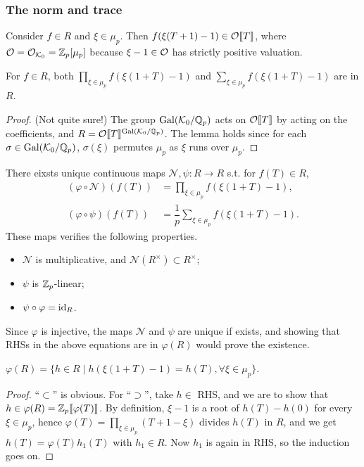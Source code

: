 \subsubsection{The norm and trace}

Consider $f\in R$ and $\xi\in\mu_p$.
Then $f(\xi(T + 1) - 1)\in \mathcal{O}\llbracket T \rrbracket$,
where $\mathcal{O} = \mathcal{O}_{\mathcal{K}_0} = \mathbb{Z}_p[\mu_p]$ because $\xi - 1\in\mathcal{O}$ has strictly positive valuation.

\begin{lemma}
    For $f\in R$, both
    $\prod_{\xi\in\mu_p} f(\xi(1 + T) - 1)$ and
    $\sum_{\xi\in\mu_p} f(\xi(1 + T) - 1)$ are in $R$.
\end{lemma}
\begin{proof}
    (Not quite sure!)
    The group $\operatorname{Gal}(\mathcal{K}_0/\mathbb{Q}_p)$ acts on $\mathcal{O}\llbracket T \rrbracket$ by acting on the coefficients,
    and $R = \mathcal{O}\llbracket T \rrbracket^{\operatorname{Gal}(\mathcal{K}_0/\mathbb{Q}_p)}$.
    The lemma holds since for each $\sigma\in\operatorname{Gal}(\mathcal{K}_0/\mathbb{Q}_p)$,
    $\sigma(\xi)$ permutes $\mu_p$ as $\xi$ runs over $\mu_p$.
\end{proof}


\begin{proposition}\label{definition of psi/trace and N/norm on Zp[[T]]}
    There eixsts unique continuous maps $\mathcal{N}, \psi : R\to R$ s.t. for $f(T)\in R$,
    \begin{align*}
        (\varphi\circ\mathcal{N})(f(T)) &= \prod_{\xi\in\mu_p} f(\xi(1 + T) - 1),\\
        (\varphi\circ\psi)(f(T)) &= \dfrac{1}{p}
        \sum_{\xi\in\mu_p} f(\xi(1 + T) - 1).
    \end{align*}
    These maps verifies the following properties.
    \begin{itemize}
\item $\mathcal{N}$ is multiplicative, and $\mathcal{N}(R^\times)\subset R^\times$;
\item $\psi$ is $\mathbb{Z}_p$-linear;
\item $\psi\circ \varphi = \operatorname{id}_R$.
    \end{itemize}
\end{proposition}
Since $\varphi$ is injective, the maps $\mathcal{N}$ and $\psi$ are unique if exists,
and showing that RHSs in the above equations are in $\varphi(R)$ would prove the existence.



\begin{lemma}\label{lem: phi(Zp[[T]])}
    $\varphi(R) = \{h\in R\mid h(\xi(1 + T) - 1) = h(T),\forall \xi\in\mu_p\}$.
\end{lemma}
\begin{proof}
    ``$\subset$'' is obvious.
    For ``$\supset$'', take $h\in$ RHS,
    and we are to show that $h\in\varphi(R) = \mathbb{Z}_p\llbracket \varphi(T) \rrbracket$.
    By definition,
    $\xi - 1$ is a root of $h(T) - h(0)$ for every $\xi\in\mu_p$,
    hence $\varphi(T) = \prod_{\xi\in\mu_p}(T + 1 - \xi)$ divides $h(T)$ in $R$,
    and we get $h(T) = \varphi(T)h_1(T)$
    with $h_1\in R$.
    Now $h_1$ is again in RHS,
    so the induction goes on.
\end{proof}

